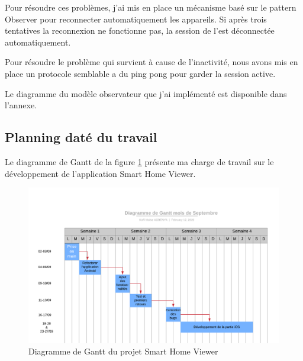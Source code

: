 Pour résoudre ces problèmes, j'ai mis en place un mécanisme basé sur le pattern Observer pour reconnecter automatiquement les appareils. Si après trois tentatives la reconnexion ne fonctionne pas, la session de l'\ut est déconnectée automatiquement.

Pour résoudre le problème qui survient à cause de l'inactivité, nous avons mis en place un protocole semblable a du ping pong pour garder la session active.

Le diagramme du modèle observateur que j'ai implémenté est disponible dans l'annexe.

\subsection{Planning daté du travail}
Le diagramme de Gantt de la figure \ref{shv_gt} présente ma charge de travail sur le développement de l'application Smart Home Viewer.

\begin{figure}[H]
	\centering
	\includegraphics[scale=0.7]{assets/images/Gantt_shv.png}
	\caption{Diagramme de Gantt du projet Smart Home Viewer}
	\label{shv_gt}
\end{figure}